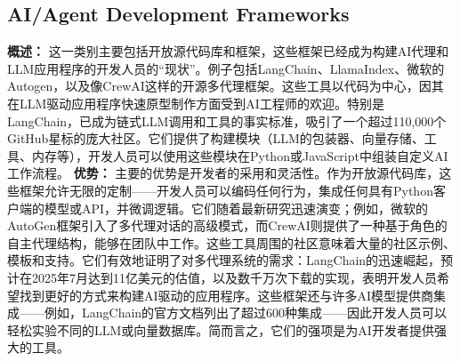 \documentclass[11pt, a4paper, oneside]{article}
\begin{document}


\subsection{AI/Agent Development Frameworks}
\textbf{概述：} 这一类别主要包括开放源代码库和框架，这些框架已经成为构建AI代理和LLM应用程序的开发人员的“现状”。例子包括LangChain、LlamaIndex、微软的Autogen，以及像CrewAI这样的开源多代理框架。这些工具以代码为中心，因其在LLM驱动应用程序快速原型制作方面受到AI工程师的欢迎。特别是LangChain，已成为链式LLM调用和工具的事实标准，吸引了一个超过110,000个GitHub星标的庞大社区\cite{langchainGitHub}。它们提供了构建模块（LLM的包装器、向量存储、工具、内存等），开发人员可以使用这些模块在Python或JavaScript中组装自定义AI工作流程。
\newline\newline
\textbf{优势：} 主要的优势是开发者的采用和灵活性。作为开放源代码库，这些框架允许无限的定制——开发人员可以编码任何行为，集成任何具有Python客户端的模型或API，并微调逻辑。它们随着最新研究迅速演变；例如，微软的AutoGen框架引入了多代理对话的高级模式\cite{autogenGitHub}，而CrewAI则提供了一种基于角色的自主代理结构，能够在团队中工作\cite{crewaiGitHub}。这些工具周围的社区意味着大量的社区示例、模板和支持。它们有效地证明了对多代理系统的需求：LangChain的迅速崛起，预计在2025年7月达到11亿美元的估值\cite{langchainValuation}，以及数千万次下载的实现，表明开发人员希望找到更好的方式来构建AI驱动的应用程序。这些框架还与许多AI模型提供商集成——例如，LangChain的官方文档列出了超过600种集成\cite{langchainIntegrations}——因此开发人员可以轻松实验不同的LLM或向量数据库。简而言之，它们的强项是为AI开发者提供强大的工具。
\newline\newline
\end{document}
